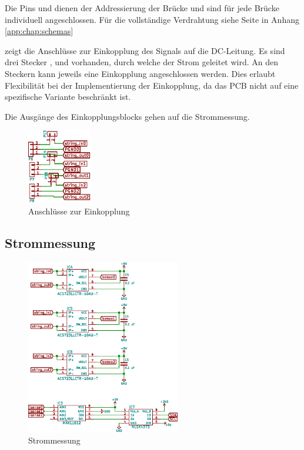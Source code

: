 Die Pins   und   dienen der  Addressierung der  Br\"ucke und
sind f\"ur  jede Br\"ucke individuell angeschlossen. F\"ur  die vollst\"andige
Verdrahtung  siehe Seite
\pageref{fig:schema:master:full}
in Anhang
\ref{app:chap:schemas}

  zeigt  die  Anschl\"usse zur  Einkopplung  des
Signals  auf  die  DC-Leitung. Es  sind drei  Stecker  ,  
und    vorhanden,  durch  welche der  Strom  geleitet  wird. An  den
Steckern  kann jeweils  eine  Einkopplung  angeschlossen werden. Dies  erlaubt
Flexibilit\"at bei der  Implementierung der Einkopplung, da das  PCB nicht auf
eine spezifische Variante beschr\"ankt ist.

Die Ausg\"ange des Einkopplungsblocks gehen auf die Strommessung.
\begin{figure}[h!tb]
    \centering
    \includegraphics[width=0.25\textwidth]{images/superv-sch/supervisor--sch--coupling.eps}
    \caption[\Master: Schema Einkopplung]{Anschl\"usse zur Einkopplung}
    \label{fig:sch:master:coupling}
\end{figure}


\subsection{Strommessung}
\label{subsec:hw:master:current}


\begin{figure}[h!t]
    \centering
    \includegraphics[angle=-90,width=0.60\textwidth]{images/superv-sch/supervisor--sch--current.eps}
    \caption[\Master: Schema Strommessung]{Strommessung}
    \label{fig:sch:master:current}
\end{figure}

